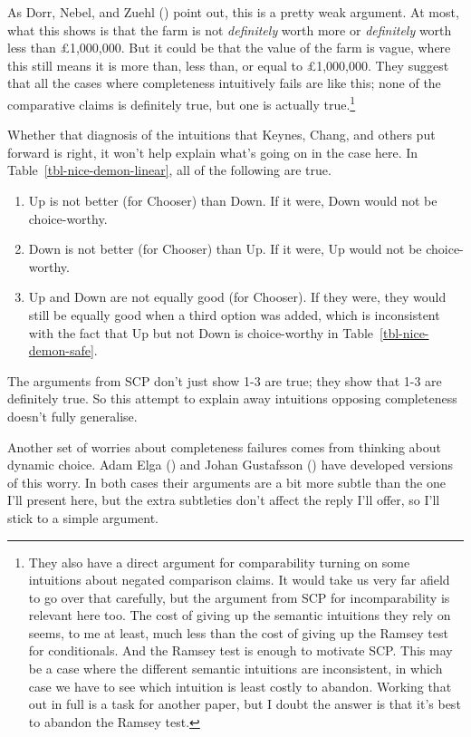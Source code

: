 \documentclass[
  11pt,
  letterpaper,
  DIV=11,
  numbers=noendperiod,
  twoside]{scrartcl}
\providecommand{\tightlist}{%
  \setlength{\itemsep}{0pt}\setlength{\parskip}{0pt}}
\begin{document}
As Dorr, Nebel, and Zuehl ()
point out, this is a pretty weak argument. At most, what this shows is
that the farm is not \emph{definitely} worth more or \emph{definitely}
worth less than £1,000,000. But it could be that the value of the farm
is vague, where this still means it is more than, less than, or equal to
£1,000,000. They suggest that all the cases where completeness
intuitively fails are like this; none of the comparative claims is
definitely true, but one is actually true.\footnote{They also have a
  direct argument for comparability turning on some intuitions about
  negated comparison claims. It would take us very far afield to go over
  that carefully, but the argument from SCP for incomparability is
  relevant here too. The cost of giving up the semantic intuitions they
  rely on seems, to me at least, much less than the cost of giving up
  the Ramsey test for conditionals. And the Ramsey test is enough to
  motivate SCP. This may be a case where the different semantic
  intuitions are inconsistent, in which case we have to see which
  intuition is least costly to abandon. Working that out in full is a
  task for another paper, but I doubt the answer is that it's best to
  abandon the Ramsey test.}

Whether that diagnosis of the intuitions that Keynes, Chang, and others
put forward is right, it won't help explain what's going on in the case
here. In Table~\ref{tbl-nice-demon-linear}, all of the following are
true.

\begin{enumerate}
\def\labelenumi{\arabic{enumi}.}
\tightlist
\item
  Up is not better (for Chooser) than Down. If it were, Down would not
  be choice-worthy.
\item
  Down is not better (for Chooser) than Up. If it were, Up would not be
  choice-worthy.
\item
  Up and Down are not equally good (for Chooser). If they were, they
  would still be equally good when a third option was added, which is
  inconsistent with the fact that Up but not Down is choice-worthy in
  Table~\ref{tbl-nice-demon-safe}.
\end{enumerate}

The arguments from SCP don't just show 1-3 are true; they show that 1-3
are definitely true. So this attempt to explain away intuitions opposing
completeness doesn't fully generalise.

Another set of worries about completeness failures comes from thinking
about dynamic choice. Adam Elga () and
Johan Gustafsson () have developed
versions of this worry. In both cases their arguments are a bit more
subtle than the one I'll present here, but the extra subtleties don't
affect the reply I'll offer, so I'll stick to a simple argument.
\end{document}
